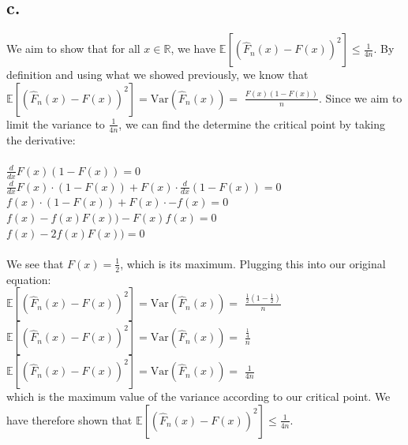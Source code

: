 \documentclass{article}
\newcommand{\field}[1]{\mathbb{#1}}
\newcommand{\1}{\mathbf{1}}
\newcommand{\E}{\mathbb{E}}
\newcommand{\R}{\field{R}} %
\begin{document}
{\subsection*{c.}
We aim to show that for all $x \in \R$, we have  $\displaystyle \E[ ( \widehat{F}_n(x) - F(x) )^2 ] \leq \tfrac{1}{4n}$. By definition and using what we showed previously, we know that $\displaystyle \E[ ( \widehat{F}_n(x) - F(x) )^2 ] = \text{Var}(\widehat{F}_n(x)) = $ $\frac{F(x)(1-F(x))}{n}$. Since we aim to limit the variance to $\frac{1}{4n}$, we can find the determine the critical point by taking the derivative: \\ \\ 
$\frac{d}{dx} F(x)(1 - F(x)) = 0$ \\
$\frac{d}{dx} F(x) \cdot (1 - F(x)) + F(x) \cdot \frac{d}{dx} (1 - F(x)) = 0$ \\
$f(x) \cdot (1 - F(x)) + F(x) \cdot -f(x) = 0$ \\
$f(x) - f(x)F(x)) - F(x)f(x) = 0$ \\
$f(x) - 2 f(x)F(x)) = 0$ \\ \\
We see that $F(x) = \frac{1}{2}$, which is its maximum. Plugging this into our original equation: \\
$\displaystyle \E[ ( \widehat{F}_n(x) - F(x) )^2 ] = \text{Var}(\widehat{F}_n(x)) = $ $\frac{\frac{1}{2}(1-\frac{1}{2})}{n}$ \\ 
$\displaystyle \E[ ( \widehat{F}_n(x) - F(x) )^2 ] = \text{Var}(\widehat{F}_n(x)) = $ $\frac{\frac{1}{4}}{n}$ \\ 
$\displaystyle \E[ ( \widehat{F}_n(x) - F(x) )^2 ] = \text{Var}(\widehat{F}_n(x)) = $ $\frac{1}{4n}$ \\
which is the maximum value of the variance according to our critical point. We have therefore shown that $\displaystyle \E[ ( \widehat{F}_n(x) - F(x) )^2 ] \leq \tfrac{1}{4n}$.

}
\end{document}
